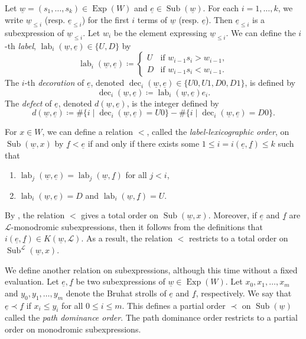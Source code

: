 \documentclass{amsart}
\newcommand{\scrL}{\mathcal{L}}
\DeclareMathOperator{\lab}{lab}
\DeclareMathOperator{\dec}{dec}
\DeclareMathOperator{\Exp}{Exp}
\DeclareMathOperator{\Subexp}{Sub}
\newcommand{\ue}{\underline{e}}
\newcommand{\uf}{\underline{f}}
\newcommand{\uw}{\underline{w}}
\theoremstyle{definition}
\numberwithin{equation}{subsection}
\begin{document}
Let $\uw = (s_1, \ldots, s_k) \in \Exp (W)$ and $\ue \in \Subexp (\uw)$.
For each $i=1, \ldots, k$, we write $\uw_{\leq i}$ (resp. $\ue_{\leq i}$) for the first $i$ terms of $\uw$ (resp. $\ue$). 
Then $\ue_{\leq i}$ is a subexpression of $\uw_{\leq i}$.
Let $w_i$ be the element expressing $\uw_{\leq i}$.
We can define the $i$-th \emph{label}, $\lab_i (\uw, \ue) \in \{ U, D\}$ by 
\[\lab_i (\uw, \ue) \coloneq \begin{cases} U & \text{if } w_{i-1} s_i > w_{i-1}, \\ D & \text{if } w_{i-1} s_i < w_{i-1}.\end{cases}\]
The $i$-th \emph{decoration} of $\ue$, denoted $\dec_i (\uw, \ue) \in \{ U0, U1, D0, D1\}$, is defined by 
\[\dec_i (\uw, \ue) \coloneq \lab_i (\uw, \ue) e_i.\]
The \emph{defect} of $\ue$, denoted $d(\uw,\ue)$, is the integer defined by
\[d(\uw,\ue) \coloneq \#\{i \mid \dec_i(\uw,\ue) = U0\} - \# \{i \mid \dec_i (\uw,\ue) = D0\}.\]

For $x \in W$, we can define a relation $<$, called the \emph{label-lexicographic order}, on $\Subexp (\uw, x)$ by $\uf < \ue$ if and only if there exists some $1 \leq i = i (\ue, \uf)  \leq k$ such that
\begin{enumerate}
    \item $\lab_j (\uw, \ue) = \lab_j (\uw, \uf)$ for all $j < i$,
    \item $\lab_i (\uw, \ue) = D$ and $\lab_i (\uw, \uf) = U$.
\end{enumerate}
By \cite[Lemma 3.9]{Abe19}, the relation $<$ gives a total order on $\Subexp (\uw, x)$. 
Moreover, if $\ue$ and $\uf$ are $\scrL$-monodromic subexpressions, then it follows from the definitions that $i (\ue, \uf) \in K(\uw, \scrL)$.
As a result, the relation $<$ restricts to a total order on $\Subexp^{\scrL} (\uw, x)$.

We define another relation on subexpressions, although this time without a fixed evaluation.
Let $\ue, \uf$ be two subexpressions of $\uw \in \Exp (W)$. 
Let $x_0, x_1, \ldots, x_m$ and $y_0, y_1, \ldots, y_m$ denote the Bruhat strolls of $\ue$ and $\uf$, respectively.
We say that $\ue \prec \uf$ if $x_i \leq y_i$ for all $0 \leq i \leq m$. This defines a partial order $\prec$ on $\Subexp (\uw)$ called the \emph{path dominance order}.
The path dominance order restricts to a partial order on monodromic subexpressions.
\end{document}
